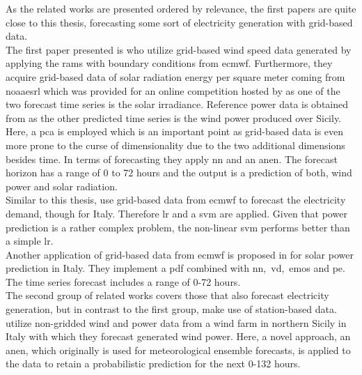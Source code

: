 As the related works are presented ordered by relevance, the first papers are quite close to this thesis, forecasting some sort of electricity generation with grid-based data.\\
The first paper presented is  who utilize grid-based wind speed data generated by applying the \gls{rams} with boundary conditions from \gls{ecmwf}. Furthermore, they acquire grid-based data of solar radiation energy per square meter coming from \gls{noaaesrl} which was provided for an online competition hosted by  as one of the two forecast time series is the solar irradiance. Reference power data is obtained from  as the other predicted time series is the wind power produced over Sicily. Here, a \gls{pca} is employed which is an important point as grid-based data is even more prone to the curse of dimensionality due to the two additional dimensions besides time. In terms of forecasting they apply \gls{nn} and an \gls{anen}. The forecast horizon has a range of 0 to 72 hours and the output is a prediction of both, wind power and solar radiation.\\
Similar to this thesis,  use grid-based data from \gls{ecmwf} to forecast the electricity demand, though for Italy. Therefore \gls{lr} and a \gls{svm} are applied. Given that power prediction is a rather complex problem, the non-linear \gls{svm} performs better than a simple \gls{lr}.\\
Another application of grid-based data from \gls{ecmwf} is proposed in  for solar power prediction in Italy. They implement a \gls{pdf} combined with \gls{nn},~\gls{vd},~\gls{emos} and \gls{pe}. The time series forecast includes a range of 0-72 hours.\\
The second group of related works covers those that also forecast electricity generation, but in contrast to the first group, make use of station-based data.\\
 utilize non-gridded wind and power data from a wind farm in northern Sicily in Italy with which they forecast generated wind power. Here, a novel approach, an \gls{anen}, which originally is used for meteorological ensemble forecasts, is applied to the data to retain a probabilistic prediction for the next 0-132 hours.\\
